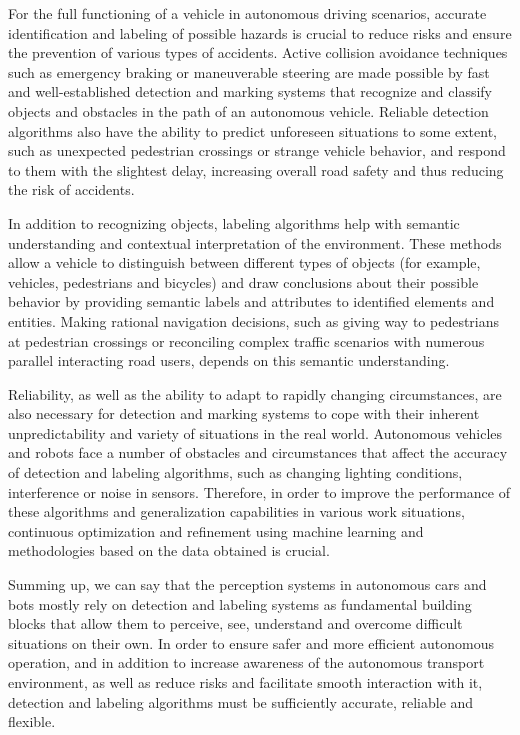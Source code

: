 For the full functioning of a vehicle in autonomous driving scenarios, accurate identification and labeling of possible hazards is crucial to reduce risks 
and ensure the prevention of various types of accidents. Active collision avoidance techniques such as emergency braking or maneuverable steering are made 
possible by fast and well-established detection and marking systems that recognize and classify objects and obstacles in the path of an autonomous vehicle. 
Reliable detection algorithms also have the ability to predict unforeseen situations to some extent, such as unexpected pedestrian crossings or strange vehicle 
behavior, and respond to them with the slightest delay, increasing overall road safety and thus reducing the risk of accidents.

In addition to recognizing objects, labeling algorithms help with semantic understanding and contextual interpretation of the environment. 
These methods allow a vehicle to distinguish between different types of objects (for example, vehicles, pedestrians and bicycles) and draw conclusions about 
their possible behavior by providing semantic labels and attributes to identified elements and entities. Making rational navigation decisions, such as giving 
way to pedestrians at pedestrian crossings or reconciling complex traffic scenarios with numerous parallel interacting road users, depends on this semantic 
understanding.

Reliability, as well as the ability to adapt to rapidly changing circumstances, are also necessary for detection and marking systems to cope with their 
inherent unpredictability and variety of situations in the real world. Autonomous vehicles and robots face a number of obstacles and circumstances that 
affect the accuracy of detection and labeling algorithms, such as changing lighting conditions, interference or noise in sensors. Therefore, in order to improve 
the performance of these algorithms and generalization capabilities in various work situations, continuous optimization and refinement using machine learning and 
methodologies based on the data obtained is crucial.

Summing up, we can say that the perception systems in autonomous cars and bots mostly rely on detection and labeling systems as fundamental building blocks that 
allow them to perceive, see, understand and overcome difficult situations on their own. In order to ensure safer and more efficient autonomous operation, 
and in addition to increase awareness of the autonomous transport environment, as well as reduce risks and facilitate smooth interaction with it, detection and 
labeling algorithms must be sufficiently accurate, reliable and flexible.

